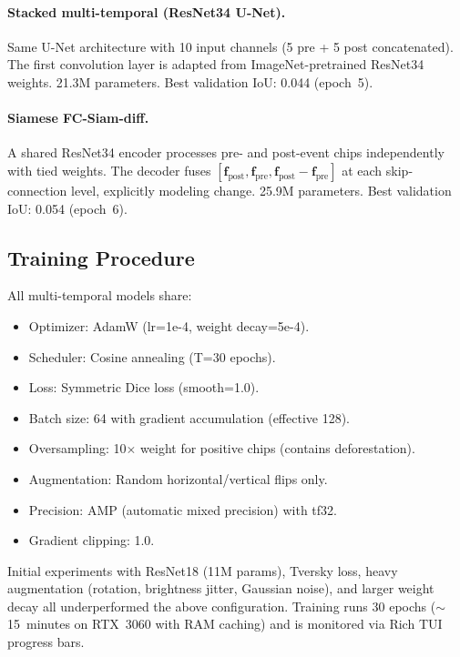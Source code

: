 \documentclass[10pt,a4paper,onecolumn]{article}
\begin{document}
\paragraph{Stacked multi-temporal (ResNet34 U-Net).}
Same U-Net architecture with 10 input channels (5 pre + 5 post
concatenated).  The first convolution layer is adapted from
ImageNet-pretrained ResNet34 weights.  21.3M parameters.  Best
validation IoU: 0.044 (epoch~5).

\paragraph{Siamese FC-Siam-diff.}
A shared ResNet34 encoder processes pre- and post-event chips
independently with tied weights.  The decoder fuses
$[\mathbf{f}_{\text{post}}, \mathbf{f}_{\text{pre}},
\mathbf{f}_{\text{post}} - \mathbf{f}_{\text{pre}}]$ at each
skip-connection level, explicitly modeling change.  25.9M parameters.
Best validation IoU: 0.054 (epoch~6).

\subsection{Training Procedure}

All multi-temporal models share:
\begin{itemize}[nosep]
    \item Optimizer: AdamW (lr=1e-4, weight decay=5e-4).
    \item Scheduler: Cosine annealing (T=30 epochs).
    \item Loss: Symmetric Dice loss (smooth=1.0).
    \item Batch size: 64 with gradient accumulation (effective 128).
    \item Oversampling: 10$\times$ weight for positive chips
          (contains deforestation).
    \item Augmentation: Random horizontal/vertical flips only.
    \item Precision: AMP (automatic mixed precision) with tf32.
    \item Gradient clipping: 1.0.
\end{itemize}

Initial experiments with ResNet18 (11M params), Tversky loss,
heavy augmentation (rotation, brightness jitter, Gaussian noise),
and larger weight decay all underperformed the above configuration.
Training runs 30 epochs ($\sim$15~minutes on RTX~3060 with RAM
caching) and is monitored via Rich TUI progress bars.
\end{document}

